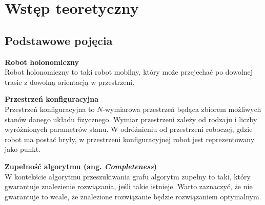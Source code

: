 \chapter{Wstęp teoretyczny}
\label{ch:theory}

\section{Podstawowe pojęcia}

\begin{definition}{\bf Robot holonomiczny\\}
	Robot holonomiczny to taki robot mobilny, który może przejechać po dowolnej trasie z dowolną orientacją w przestrzeni.
\end{definition}

\vspace{0em}
\begin{definition}{\bf Przestrzeń konfiguracyjna\\}
	Przestrzeń konfiguracyjna to $N$-wymiarowa przestrzeń będąca zbiorem możliwych stanów danego układu fizycznego.
	Wymiar przestrzeni zależy od rodzaju i liczby wyróżnionych parametrów stanu.
	W odróżnieniu od przestrzeni roboczej, gdzie robot ma postać bryły, w przestrzeni konfiguracyjnej robot jest reprezentowany jako punkt.
\end{definition}

\vspace{0em}
\begin{definition}{\bf Zupełność algorytmu (ang. {\it Completeness})\\}
	W kontekście algorytmu przeszukiwania grafu algorytm zupełny to taki, który gwarantuje znalezienie rozwiązania, jeśli takie istnieje.
	Warto zaznaczyć, że nie gwarantuje to wcale, że znalezione rozwiązanie będzie rozwiązaniem optymalnym.
\end{definition}

